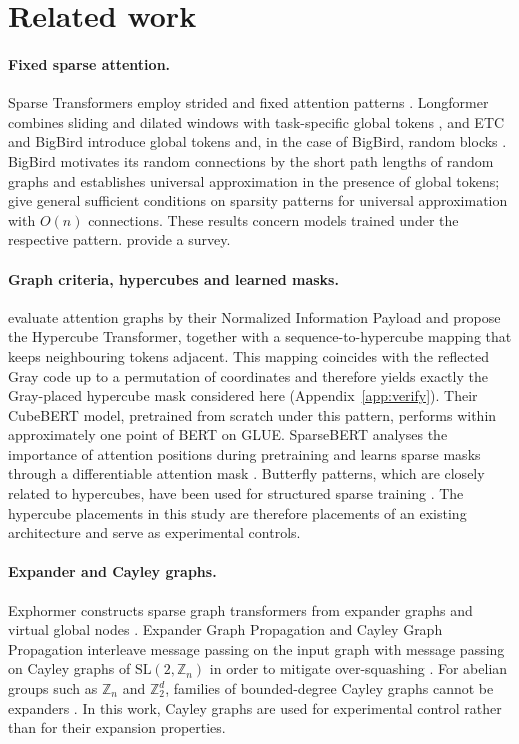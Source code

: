 \documentclass[10pt]{article}
\newcommand{\Z}{\mathbb{Z}}
\begin{document}
\section{Related work}
\label{sec:related}

\paragraph{Fixed sparse attention.} Sparse Transformers employ strided and fixed attention patterns \citep{child2019generating}. Longformer combines sliding and dilated windows with task-specific global tokens \citep{beltagy2020longformer}, and ETC and BigBird introduce global tokens and, in the case of BigBird, random blocks \citep{ainslie2020etc,zaheer2020bigbird}. BigBird motivates its random connections by the short path lengths of random graphs and establishes universal approximation in the presence of global tokens; \citet{yun2020on} give general sufficient conditions on sparsity patterns for universal approximation with $O(n)$ connections. These results concern models trained under the respective pattern. \citet{tay2022efficient} provide a survey.

\paragraph{Graph criteria, hypercubes and learned masks.} \citet{wang2022dense} evaluate attention graphs by their Normalized Information Payload and propose the Hypercube Transformer, together with a sequence-to-hypercube mapping that keeps neighbouring tokens adjacent. This mapping coincides with the reflected Gray code up to a permutation of coordinates and therefore yields exactly the Gray-placed hypercube mask considered here (Appendix~\ref{app:verify}). Their CubeBERT model, pretrained from scratch under this pattern, performs within approximately one point of BERT on GLUE. SparseBERT analyses the importance of attention positions during pretraining and learns sparse masks through a differentiable attention mask \citep{shi2021sparsebert}. Butterfly patterns, which are closely related to hypercubes, have been used for structured sparse training \citep{dao2019learning,chen2022pixelated}. The hypercube placements in this study are therefore placements of an existing architecture and serve as experimental controls.

\paragraph{Expander and Cayley graphs.} Exphormer constructs sparse graph transformers from expander graphs and virtual global nodes \citep{shirzad2023exphormer}. Expander Graph Propagation and Cayley Graph Propagation interleave message passing on the input graph with message passing on Cayley graphs of $\mathrm{SL}(2,\Z_n)$ in order to mitigate over-squashing \citep{deac2022expander,wilson2025cayley}. For abelian groups such as $\Z_n$ and $\Z_2^d$, families of bounded-degree Cayley graphs cannot be expanders \citep{alon1994random,hoory2006expander}. In this work, Cayley graphs are used for experimental control rather than for their expansion properties.
\end{document}

